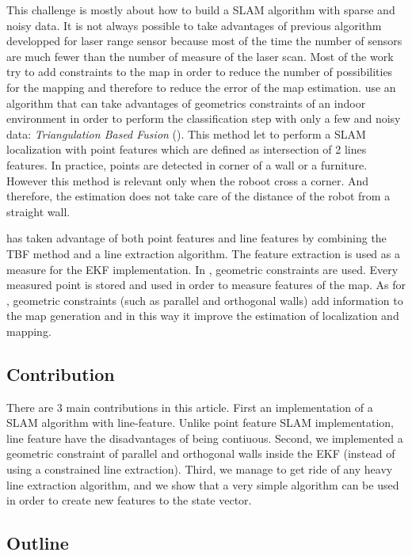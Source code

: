 \documentclass[a4paper,12pt]{article}
\begin{document}
This challenge is mostly about how to build a SLAM algorithm with sparse and noisy data.
It is not always possible to take advantages of previous algorithm developped for laser range sensor because most of the time the number of sensors are much fewer than the number of measure of the laser scan.
Most of the work try to add constraints to the map in order to reduce the number of possibilities for the mapping and therefore to reduce the error of the map estimation. \cite{zunino2001simultaneous} use an algorithm that can take advantages of geometrics constraints of an indoor environment in order to perform the classification step with only a few and noisy data: \textit{Triangulation Based Fusion} (\cite{wijk1998triangulation}). This method let to perform a SLAM localization with point features which are defined as intersection of 2 lines features. In practice, points are detected in corner of a wall or a furniture.
However this method is relevant only when the roboot cross a corner. And therefore, the estimation does not take care of the distance of the robot from a straight wall.

\cite{choi2005robust} has taken advantage of both point features and line features by combining the TBF method and a line extraction algorithm. The feature extraction is used as a measure for the EKF implementation.
In \cite{choi2008line}, geometric constraints are used. Every measured point is stored and used in order to measure features of the map.
As for \cite{nguyen2006orthogonal}, geometric constraints (such as parallel and orthogonal walls) add information to the map generation and in this way it improve the estimation of localization and mapping.

\subsection{Contribution}
There are 3 main contributions in this article.
First an implementation of a SLAM algorithm with line-feature. Unlike point feature SLAM implementation, line feature have the disadvantages of being contiuous.
Second, we implemented a geometric constraint of parallel and orthogonal walls inside the EKF (instead of using a constrained line extraction).
Third, we manage to get ride of any heavy line extraction algorithm, and we show that a very simple algorithm can be used in order to create new features to the state vector.

\subsection{Outline}
\end{document}
